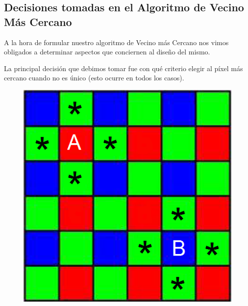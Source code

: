 \documentclass[a4paper]{article}
\begin{document}
\newpage
\subsection*{Decisiones tomadas en el Algoritmo de Vecino M\'as Cercano}

A la hora de formular nuestro algoritmo de Vecino m\'as Cercano nos vimos obligados a determinar aspectos que conciernen al dise\~no del mismo. 

La principal decisi\'on que debimos tomar fue con qu\'e criterio elegir al p\'ixel m\'as cercano cuando no es \'unico (esto ocurre en todos los casos). 

\begin{figure}[h!]
	\caption{}
	\begin{center}
	\includegraphics[scale=0.36]{imagenes/vecino1}
	\label{Vecino1}
  \end{center}
\end{figure}
\end{document}
